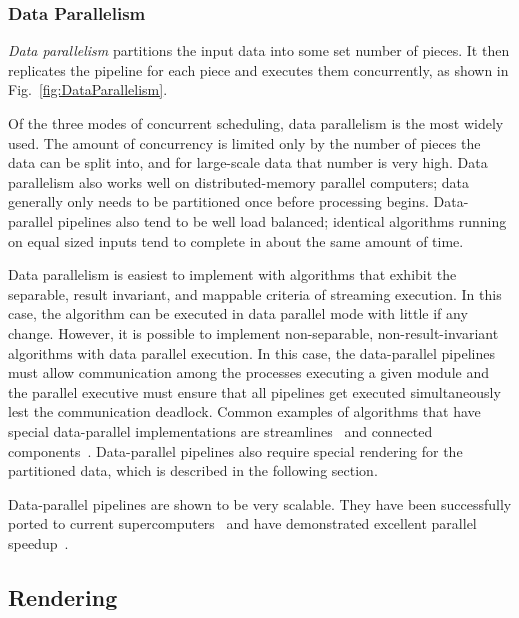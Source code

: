 \documentclass[journal,twocolumn,10pt,letterpaper,twoside]{IEEEtran}
\newcommand*{\lcite}[1]{~\cite{#1}}
\newcommand*{\figref}[1]{Fig.~\ref{#1}}
\newcommand*{\keyterm}[1]{\emph{#1}}
\newcommand{\fix}[1]{}
\begin{document}
\subsubsection{Data Parallelism}
\label{sec:DataParallelism}

\keyterm{Data parallelism} partitions the input data into some set number
of pieces.  It then replicates the pipeline for each piece and executes
them concurrently, as shown in \figref{fig:DataParallelism}.

Of the three modes of concurrent scheduling, data parallelism is the most
widely used.  The amount of concurrency is limited only by the number of
pieces the data can be split into, and for large-scale data that number is
very high.  Data parallelism also works well on distributed-memory parallel
computers; data generally only needs to be partitioned once before
processing begins.  Data-parallel pipelines also tend to be well load
balanced; identical algorithms running on equal sized inputs tend to
complete in about the same amount of time.

Data parallelism is easiest to implement with algorithms that exhibit the
separable, result invariant, and mappable criteria of streaming execution.
In this case, the algorithm can be executed in data parallel mode with
little if any change.  However, it is possible to implement non-separable,
non-result-invariant algorithms with data parallel execution.  In this
case, the data-parallel pipelines must allow communication among the
processes executing a given module and the parallel executive must
ensure that all pipelines get executed simultaneously lest the
communication deadlock.  Common examples of algorithms that have special
data-parallel implementations are streamlines\lcite{Pugmire2009} and
connected components\lcite{Moreland2008:UltraVis}.  Data-parallel pipelines
also require special rendering for the partitioned data, which is described
in the following section.

Data-parallel pipelines are shown to be very scalable.  They have been
successfully ported to current
supercomputers\lcite{Moreland2008:CUG,Pugmire2008,Patchett2009} and have
demonstrated excellent parallel speedup\lcite{Childs2010}.

\fix{The Gordon Bell submission will be a good reference here once it is
  published.}

\subsection{Rendering}
\label{sec:ParallelExecution:Rendering}
\end{document}
